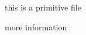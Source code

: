 \documentclass[11pt]{article}
\begin{document}
    
    this is a primitive file
    
    

    
    
    more information
\end{document}
